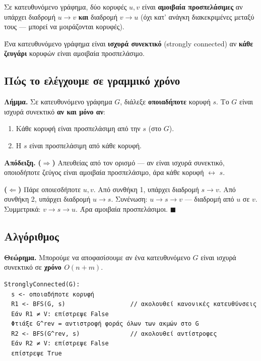 \documentclass[11pt,a4paper]{article}
\begin{document}
Σε κατευθυνόμενο γράφημα, δύο κορυφές $u, v$ είναι \textbf{αμοιβαία
προσπελάσιμες} αν υπάρχει διαδρομή $u \to v$ \textbf{και} διαδρομή $v \to u$ (όχι
κατ' ανάγκη διακεκριμένες μεταξύ τους --- μπορεί να μοιράζονται κορυφές).

Ένα κατευθυνόμενο γράφημα είναι \textbf{ισχυρά συνεκτικό} (strongly connected)
αν \textbf{κάθε ζευγάρι} κορυφών είναι αμοιβαία προσπελάσιμο.

\subsection{Πώς το ελέγχουμε σε γραμμικό χρόνο}

\begin{keypoint}
\textbf{Λήμμα.} Σε κατευθυνόμενο γράφημα $G$, διάλεξε \textbf{οποιαδήποτε} κορυφή
$s$. Το $G$ είναι ισχυρά συνεκτικό \textbf{αν και μόνο αν}:
\begin{enumerate}
  \item Κάθε κορυφή είναι προσπελάσιμη από την $s$ (στο $G$).
  \item Η $s$ είναι προσπελάσιμη από κάθε κορυφή.
\end{enumerate}

\textbf{Απόδειξη.} \textbf{($\Rightarrow$)} Απευθείας από τον ορισμό --- αν είναι
ισχυρά συνεκτικό, οποιοδήποτε ζεύγος είναι αμοιβαία προσπελάσιμο, άρα κάθε κορυφή
$\leftrightarrow$ $s$.

\textbf{($\Leftarrow$)} Πάρε οποιεσδήποτε $u, v$. Από συνθήκη 1, υπάρχει διαδρομή
$s \to v$. Από συνθήκη 2, υπάρχει διαδρομή $u \to s$. Συνένωση: $u \to s \to v$
--- διαδρομή από $u$ σε $v$. Συμμετρικά: $v \to s \to u$. Άρα αμοιβαία
προσπελάσιμοι. $\blacksquare$
\end{keypoint}

\subsection{Αλγόριθμος}

\textbf{Θεώρημα.} Μπορούμε να αποφασίσουμε αν ένα κατευθυνόμενο $G$ είναι ισχυρά
συνεκτικό σε \textbf{χρόνο $O(n + m)$}.

\begin{codebox}
\begin{verbatim}
StronglyConnected(G):
  s <- οποιαδήποτε κορυφή
  R1 <- BFS(G, s)                  // ακολουθεί κανονικές κατευθύνσεις
  Εάν R1 ≠ V: επίστρεψε False
  Φτιάξε G^rev = αντιστροφή φοράς όλων των ακμών στο G
  R2 <- BFS(G^rev, s)              // ακολουθεί αντίστροφες
  Εάν R2 ≠ V: επίστρεψε False
  επίστρεψε True
\end{verbatim}
\end{codebox}
\end{document}
